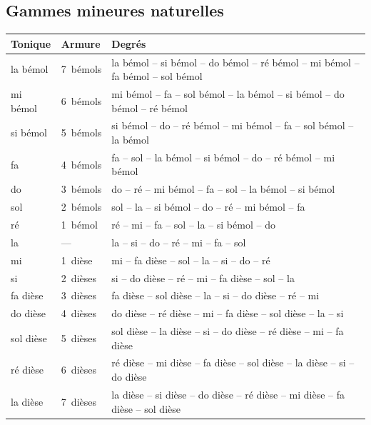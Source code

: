 \subsection{Gammes mineures naturelles}
\begin{longtable}{@{}l l >{\raggedright\arraybackslash}p{12.6cm}@{}}
\toprule
\textbf{Tonique} & \textbf{Armure} & \textbf{Degrés} \\
\midrule
\endhead
la bémol & 7~bémols & la bémol -- si bémol -- do bémol -- ré bémol -- mi bémol -- fa bémol -- sol bémol \\
mi bémol & 6~bémols & mi bémol -- fa -- sol bémol -- la bémol -- si bémol -- do bémol -- ré bémol \\
si bémol & 5~bémols & si bémol -- do -- ré bémol -- mi bémol -- fa -- sol bémol -- la bémol \\
fa & 4~bémols & fa -- sol -- la bémol -- si bémol -- do -- ré bémol -- mi bémol \\
do & 3~bémols & do -- ré -- mi bémol -- fa -- sol -- la bémol -- si bémol \\
sol & 2~bémols & sol -- la -- si bémol -- do -- ré -- mi bémol -- fa \\
ré & 1~bémol & ré -- mi -- fa -- sol -- la -- si bémol -- do \\
la & --- & la -- si -- do -- ré -- mi -- fa -- sol \\
mi & 1~dièse & mi -- fa dièse -- sol -- la -- si -- do -- ré \\
si & 2~dièses & si -- do dièse -- ré -- mi -- fa dièse -- sol -- la \\
fa dièse & 3~dièses & fa dièse -- sol dièse -- la -- si -- do dièse -- ré -- mi \\
do dièse & 4~dièses & do dièse -- ré dièse -- mi -- fa dièse -- sol dièse -- la -- si \\
sol dièse & 5~dièses & sol dièse -- la dièse -- si -- do dièse -- ré dièse -- mi -- fa dièse \\
ré dièse & 6~dièses & ré dièse -- mi dièse -- fa dièse -- sol dièse -- la dièse -- si -- do dièse \\
la dièse & 7~dièses & la dièse -- si dièse -- do dièse -- ré dièse -- mi dièse -- fa dièse -- sol dièse \\
\bottomrule
\end{longtable}

